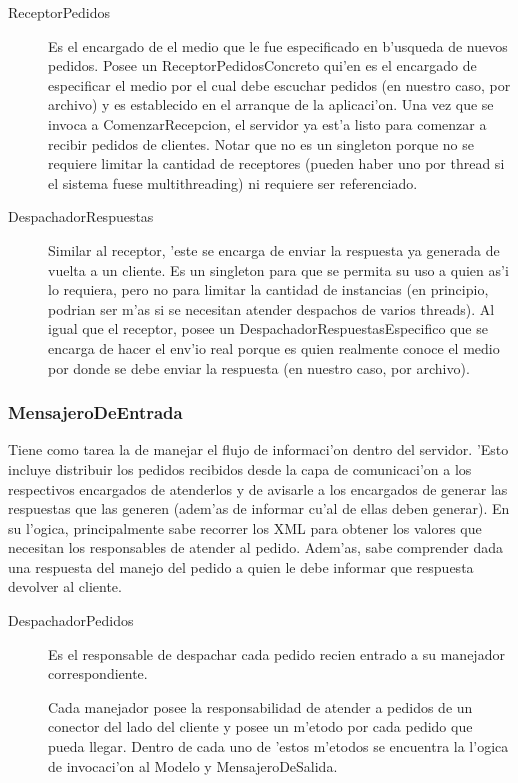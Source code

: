 \begin{description}
\item[ReceptorPedidos] Es el encargado de  el medio que le fue especificado en b'usqueda de nuevos pedidos. Posee un ReceptorPedidosConcreto qui'en es el encargado de especificar el medio por el cual debe escuchar pedidos (en nuestro caso, por archivo) y es establecido en el arranque de la aplicaci'on. Una vez que se invoca a ComenzarRecepcion, el servidor ya est'a listo para comenzar a recibir pedidos de clientes. Notar que no es un singleton porque no se requiere limitar la cantidad de receptores (pueden haber uno por thread si el sistema fuese multithreading) ni requiere ser referenciado. 
\item[DespachadorRespuestas] Similar al receptor, 'este se encarga de enviar la respuesta ya generada de vuelta a un cliente. Es un singleton para que se permita su uso a quien as'i lo requiera, pero no para limitar la cantidad de instancias (en principio, podrian ser m'as si se necesitan atender despachos de varios threads). Al igual que el receptor, posee un DespachadorRespuestasEspecifico que se encarga de hacer el env'io real porque es quien realmente conoce el medio por donde se debe enviar la respuesta (en nuestro caso, por archivo).
\end{description}


\subsubsection{MensajeroDeEntrada}
Tiene como tarea la de manejar el flujo de informaci'on dentro del servidor. 'Esto incluye distribuir los pedidos recibidos desde la capa de comunicaci'on a los respectivos encargados de atenderlos y de avisarle a los encargados de generar las respuestas que las generen (adem'as de informar cu'al de ellas deben generar). En su l'ogica, principalmente sabe recorrer los XML para obtener los valores que necesitan los responsables de atender al pedido. Adem'as, sabe comprender dada una respuesta del manejo del pedido a quien le debe informar que respuesta devolver al cliente.


\begin{description}
\item[DespachadorPedidos] Es el responsable de despachar cada pedido recien entrado a su manejador correspondiente.
\item[] Cada manejador posee la responsabilidad de atender a pedidos de un conector del lado del cliente y posee un m'etodo por cada pedido que pueda llegar. Dentro de cada uno de 'estos m'etodos se encuentra la l'ogica de invocaci'on al Modelo y MensajeroDeSalida.
\end{description}


